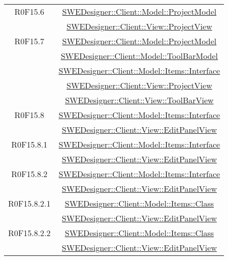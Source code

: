 \documentclass[../DefinizioneDiProdotto.tex]{subfiles}
\begin{document}
\begin{longtable}{|c|c|}
				R0F15.6
				& \hyperlink{SWEDesigner::Client::Model::ProjectModel}{SWEDesigner::Client::Model::ProjectModel}\\
				& \hyperlink{SWEDesigner::Client::View::ProjectView}{SWEDesigner::Client::View::ProjectView}\\
				\hline

				R0F15.7
				& \hyperlink{SWEDesigner::Client::Model::ProjectModel}{SWEDesigner::Client::Model::ProjectModel}\\
				& \hyperlink{SWEDesigner::Client::Model::ToolBarModel}{SWEDesigner::Client::Model::ToolBarModel}\\
				& \hyperlink{SWEDesigner::Client::Model::Items::Interface}{SWEDesigner::Client::Model::Items::Interface}\\
				& \hyperlink{SWEDesigner::Client::View::ProjectView}{SWEDesigner::Client::View::ProjectView}\\
				& \hyperlink{SWEDesigner::Client::View::ToolBarView}{SWEDesigner::Client::View::ToolBarView}\\
				\hline

				R0F15.8
				& \hyperlink{SWEDesigner::Client::Model::Items::Interface}{SWEDesigner::Client::Model::Items::Interface}\\
				& \hyperlink{SWEDesigner::Client::View::EditPanelView}{SWEDesigner::Client::View::EditPanelView}\\
				\hline

				R0F15.8.1
				& \hyperlink{SWEDesigner::Client::Model::Items::Interface}{SWEDesigner::Client::Model::Items::Interface}\\
				& \hyperlink{SWEDesigner::Client::View::EditPanelView}{SWEDesigner::Client::View::EditPanelView}\\
				\hline

				R0F15.8.2
				& \hyperlink{SWEDesigner::Client::Model::Items::Interface}{SWEDesigner::Client::Model::Items::Interface}\\
				& \hyperlink{SWEDesigner::Client::View::EditPanelView}{SWEDesigner::Client::View::EditPanelView}\\
				\hline

				R0F15.8.2.1
				& \hyperlink{SWEDesigner::Client::Model::Items::Class}{SWEDesigner::Client::Model::Items::Class}\\
				& \hyperlink{SWEDesigner::Client::View::EditPanelView}{SWEDesigner::Client::View::EditPanelView}\\
				\hline

				R0F15.8.2.2
				& \hyperlink{SWEDesigner::Client::Model::Items::Class}{SWEDesigner::Client::Model::Items::Class}\\
				& \hyperlink{SWEDesigner::Client::View::EditPanelView}{SWEDesigner::Client::View::EditPanelView}\\
				\hline


\end{longtable}
\end{document}
